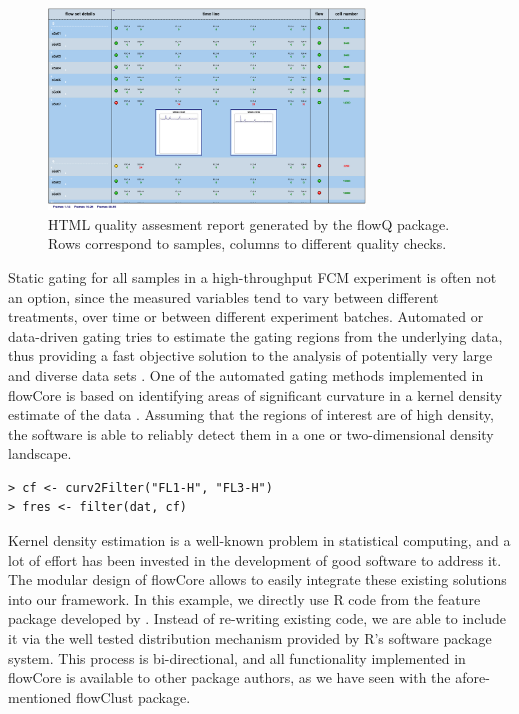 \documentclass[12pt]{article}
\begin{document}
\begin{figure}[htbp]
\centering
\includegraphics[width=0.75\textwidth]{flowQ.jpg}
\caption{\label{flowQ}%
  HTML quality assesment report generated by
  the flowQ package. Rows correspond to samples, columns to different
  quality checks.}
\end{figure}

Static gating for all samples in a high-throughput FCM experiment is
often not an option, since the measured variables tend to vary between
different treatments, over time or between different experiment
batches. Automated or data-driven gating tries to estimate the gating
regions from the underlying data, thus providing a fast objective
solution to the analysis of potentially very large and diverse data
sets \cite{lo2008agf}. One of the automated gating methods implemented
in flowCore is based on identifying areas of significant curvature in
a kernel density estimate of the data \citep{wand2008}. Assuming that
the regions of interest are of high density, the software is able to
reliably detect them in a one or two-dimensional density landscape.

\begin{verbatim}
> cf <- curv2Filter("FL1-H", "FL3-H")
> fres <- filter(dat, cf)
\end{verbatim}

Kernel density estimation is a well-known problem in statistical
computing, and a lot of effort has been invested in the development of
good software to address it. The modular design of flowCore allows to
easily integrate these existing solutions into our framework. In this
example, we directly use R code from the feature package developed by
\cite{wand2008}. Instead of re-writing existing code, we are able to
include it via the well tested distribution mechanism provided by R's
software package system. This process is bi-directional, and all
functionality implemented in flowCore is available to other package
authors, as we have seen with the afore-mentioned flowClust package.
\end{document}
